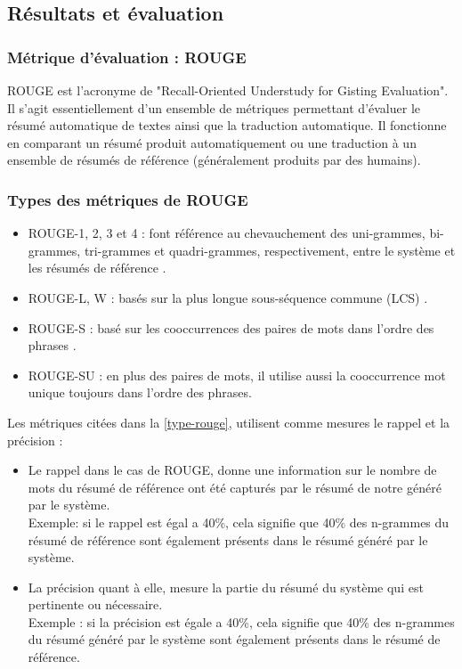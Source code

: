     \subsection{Résultats et évaluation}
        \subsubsection{Métrique d'évaluation : ROUGE\label{metrique-eval}}
        ROUGE est l'acronyme de "Recall-Oriented Understudy for Gisting Evaluation". Il s'agit essentiellement d'un ensemble de métriques permettant d'évaluer le résumé automatique de textes ainsi que la traduction automatique. Il fonctionne en comparant un résumé produit automatiquement ou une traduction à un ensemble de résumés de référence (généralement produits par des humains). \cite{rouge0}
    
        \subsubsection{Types des métriques de ROUGE\label{type-rouge}}
        \begin{itemize}
            \item{ROUGE-1, 2, 3 et 4 : font référence au chevauchement des uni-grammes, bi-grammes, tri-grammes et quadri-grammes, respectivement, entre le système et les résumés de référence \cite{rouge1}.}\\
            \item{ROUGE-L, W : basés sur la plus longue sous-séquence commune (LCS) \cite{rouge2}.}\\
            \item{ROUGE-S : basé sur les cooccurrences des paires de mots dans l'ordre des phrases \cite{rouge2}.}\\
            \item{ROUGE-SU : en plus des paires de mots, il utilise aussi la cooccurrence mot unique toujours dans l'ordre des phrases.}
        \end{itemize}
    
        Les métriques citées dans la \autoref{type-rouge}, utilisent comme mesures le rappel et la précision :  
        \begin{itemize}
            \item {Le rappel dans le cas de ROUGE, donne une information sur le nombre de mots du résumé de référence ont été capturés par le résumé de notre généré par le système.\\ 
            Exemple: si le rappel est égal a 40\%, cela signifie que 40\% des n-grammes du résumé de référence sont également présents dans le résumé généré par le système.}\\
            \item {La précision quant à elle, mesure la partie du résumé du système qui est pertinente ou nécessaire.\\ 
            Exemple : si la précision est égale a 40\%, cela signifie que 40\% des n-grammes du résumé généré par le système sont également présents dans le résumé de référence.}
        \end{itemize}

